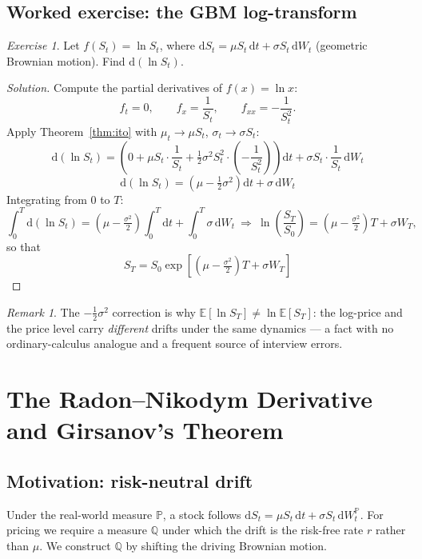 \documentclass[11pt]{article}
\theoremstyle{definition}
\theoremstyle{remark}
\newtheorem{remark}[theorem]{Remark}
\newtheorem*{exercise}{Exercise}
\newcommand{\dd}{\mathrm{d}}
\newcommand{\E}{\mathbb{E}}
\renewcommand{\P}{\mathbb{P}}
\newcommand{\Q}{\mathbb{Q}}
\begin{document}
\subsection{Worked exercise: the GBM log-transform}

\begin{exercise}
Let $f(S_t) = \ln S_t$, where $\dd S_t = \mu S_t\,\dd t + \sigma S_t\,\dd W_t$ (geometric Brownian
motion). Find $\dd(\ln S_t)$.
\end{exercise}

\begin{proof}[Solution]
Compute the partial derivatives of $f(x) = \ln x$:
\[
f_t = 0, \qquad f_x = \frac{1}{S_t}, \qquad f_{xx} = -\frac{1}{S_t^2}.
\]
Apply Theorem~\ref{thm:ito} with $\mu_t \to \mu S_t$, $\sigma_t \to \sigma S_t$:
\[
\dd(\ln S_t) = \left(0 + \mu S_t \cdot \frac{1}{S_t} + \tfrac12 \sigma^2 S_t^2 \cdot\left(-\frac{1}{S_t^2}\right)\right)\dd t
+ \sigma S_t \cdot \frac{1}{S_t}\,\dd W_t
\]
\[
\boxed{\ \dd(\ln S_t) = \left(\mu - \tfrac12\sigma^2\right)\dd t + \sigma\,\dd W_t\ }
\]
Integrating from $0$ to $T$:
\[
\int_0^T \dd(\ln S_t) = \left(\mu - \tfrac{\sigma^2}{2}\right)\int_0^T \dd t + \int_0^T \sigma\,\dd W_t
\ \Longrightarrow\
\ln\!\left(\frac{S_T}{S_0}\right) = \left(\mu-\tfrac{\sigma^2}{2}\right)T + \sigma W_T,
\]
so that
\[
\boxed{\ S_T = S_0\exp\!\left[\left(\mu - \tfrac{\sigma^2}{2}\right)T + \sigma W_T\right]\ }
\]
\end{proof}

\begin{remark}
The $-\tfrac12\sigma^2$ correction is why $\E[\ln S_T] \ne \ln \E[S_T]$: the log-price and the price
level carry \emph{different} drifts under the same dynamics — a fact with no ordinary-calculus
analogue and a frequent source of interview errors.
\end{remark}

\section{The Radon--Nikodym Derivative and Girsanov's Theorem}

\subsection{Motivation: risk-neutral drift}

Under the real-world measure $\P$, a stock follows $\dd S_t = \mu S_t\,\dd t + \sigma S_t\,\dd W_t^\P$.
For pricing we require a measure $\Q$ under which the drift is the risk-free rate $r$ rather than
$\mu$. We construct $\Q$ by shifting the driving Brownian motion.
\end{document}

